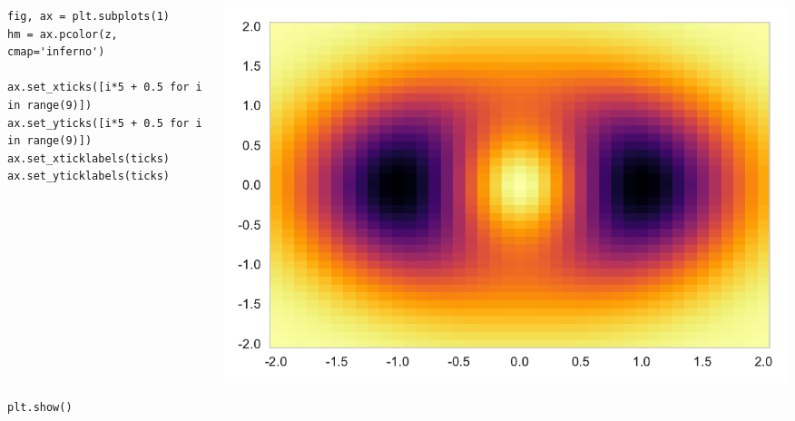 \documentclass{beamer}
\begin{document}
\begin{frame}[fragile]
\tiny{
\begin{columns}
\begin{column}{0.45\textwidth}
\begin{verbatim}
fig, ax = plt.subplots(1)
hm = ax.pcolor(z, cmap='inferno')

ax.set_xticks([i*5 + 0.5 for i in range(9)])
ax.set_yticks([i*5 + 0.5 for i in range(9)])
ax.set_xticklabels(ticks)
ax.set_yticklabels(ticks)












plt.show()
\end{verbatim}
\end{column}
\begin{column}{0.55\textwidth}
\includegraphics[width=\textwidth]{../heatmap_3.pdf}
\end{column}
\end{columns}
}
\end{frame}
\end{document}
